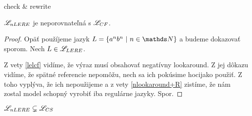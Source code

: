 \TODO check \& rewrite
\begin{veta}
$\mathscr{L}_{nLERE}$ je neporovnateľná s $ \mathscr{L}_{CF}$.
\end{veta}
\begin{proof}
Opäť použíjeme jazyk $L=\lbrace a^nb^n~|~n \in \N \rbrace$ a budeme dokazovať sporom. Nech $L \in \mathscr{L}_{LERE}$.

Z vety \ref{lelcf} vidíme, že výraz musí obsahovať negatívny lookaround. Z jej dôkazu vidíme, že spätné referencie nepomôžu, nech sa ich pokúsime hocijako použiť. Z toho vyplýva, že ich nepoužijeme a z vety \ref{nlookaround+R} zistíme, že nám zostal model schopný vyrobiť iba regulárne jazyky. Spor.
\end{proof}

\begin{dosledok}
$\mathscr{L}_{nLERE} \subsetneq \mathscr{L}_{CS}$
\end{dosledok}


